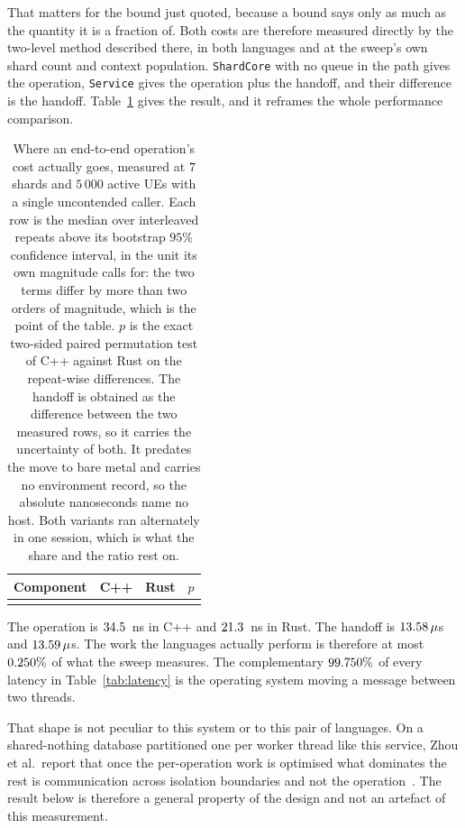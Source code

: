 \documentclass[english,oneside,a4paper,censored,csm,software-track-2020]{HYthesisML}
\begin{document}
That matters for the bound just quoted, because a bound says only as much as the quantity
it is a fraction of. Both costs are therefore measured directly by the two-level method described
there, in both languages and at the sweep's own shard count and context population.
\texttt{ShardCore} with no queue in the path gives the operation, \texttt{Service} gives the
operation plus the handoff, and their difference is the handoff.
Table~\ref{tab:budget} gives the result, and it reframes the whole performance comparison.

\begin{table}[tp]
\centering
\small
\caption[Where an end-to-end operation's cost actually goes]{Where an end-to-end operation's cost actually goes, measured at $7$ shards and
$5\,000$ active UEs with a single uncontended caller. Each row is the median over
\BudgetRepeats{} interleaved repeats above its bootstrap $95\%$ confidence interval, in the
unit its own magnitude calls for: the two terms differ by more than two orders of magnitude,
which is the point of the table. $p$ is the exact two-sided paired permutation test of C++
against Rust on the repeat-wise differences. The handoff is obtained as the difference between
the two measured rows, so it carries the uncertainty of both. It predates the move to bare metal and
carries no environment record, so the absolute nanoseconds name no host. Both variants ran alternately in
one session, which is what the share and the ratio rest on.\label{tab:budget}}
\begin{tabular}{@{}l r r r@{}}
\hline\hline
Component & C++ & Rust & $p$ \\
\hline
\\
\hline
\end{tabular}
\end{table}

The operation is $34.5$~ns in C++ and $21.3$~ns in Rust. The handoff is
$13.58\,\mu$s and $13.59\,\mu$s. The work the languages actually
perform is therefore at most $0.250\%$ of what the sweep measures. The
complementary $99.750\%$ of every latency in Table~\ref{tab:latency} is the
operating system moving a message between two threads.

That shape is not peculiar to this system or to this pair of languages. On a shared-nothing
database partitioned one per worker thread like this service, Zhou et al.\ report that once the
per-operation work is optimised what dominates the rest is communication across isolation
boundaries and not the operation~\cite{zhou2025oltp}. The result below is therefore a general
property of the design and not an artefact of this measurement.
\end{document}

